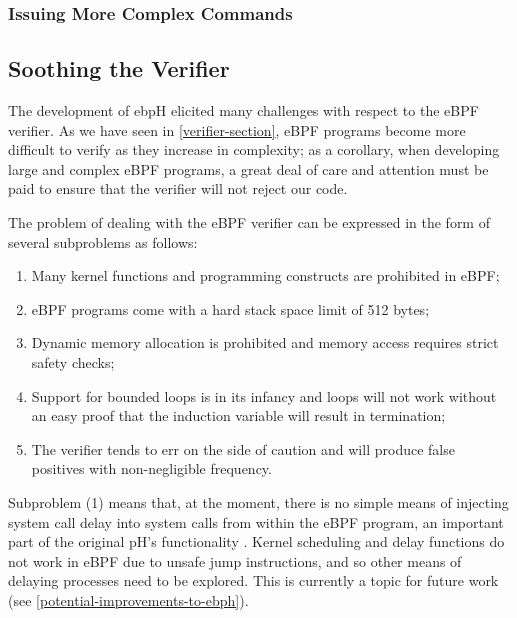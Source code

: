 \documentclass[
  12pt]{findlay}
\providecommand{\tightlist}{%
  \setlength{\itemsep}{0pt}\setlength{\parskip}{0pt}}
\begin{document}
\hypertarget{issuing-more-complex-commands}{%
\subsubsection{Issuing More Complex
Commands}\label{issuing-more-complex-commands}}

\hypertarget{soothing-the-verifier}{%
\subsection{Soothing the Verifier}\label{soothing-the-verifier}}

The development of ebpH elicited many challenges with respect to the
eBPF verifier. As we have seen in \autoref{verifier-section}, eBPF
programs become more difficult to verify as they increase in complexity;
as a corollary, when developing large and complex eBPF programs, a great
deal of care and attention must be paid to ensure that the verifier will
not reject our code.

The problem of dealing with the eBPF verifier can be expressed in the
form of several subproblems as follows:

\begin{enumerate}
\def\labelenumi{(\arabic{enumi})}
\tightlist
\item
  Many kernel functions and programming constructs are prohibited in
  eBPF;
\item
  eBPF programs come with a hard stack space limit of 512 bytes;
\item
  Dynamic memory allocation is prohibited and memory access requires
  strict safety checks;
\item
  Support for bounded loops is in its infancy and loops will not work
  without an easy proof that the induction variable will result in
  termination;
\item
  The verifier tends to err on the side of caution and will produce
  false positives with non-negligible frequency.
\end{enumerate}

Subproblem (1) means that, at the moment, there is no simple means of
injecting system call delay into system calls from within the eBPF
program, an important part of the original pH's functionality
\autocite{soma02}. Kernel scheduling and delay functions do not work in
eBPF due to unsafe jump instructions, and so other means of delaying
processes need to be explored. This is currently a topic for future work
(see \autoref{potential-improvements-to-ebph}).
\end{document}
